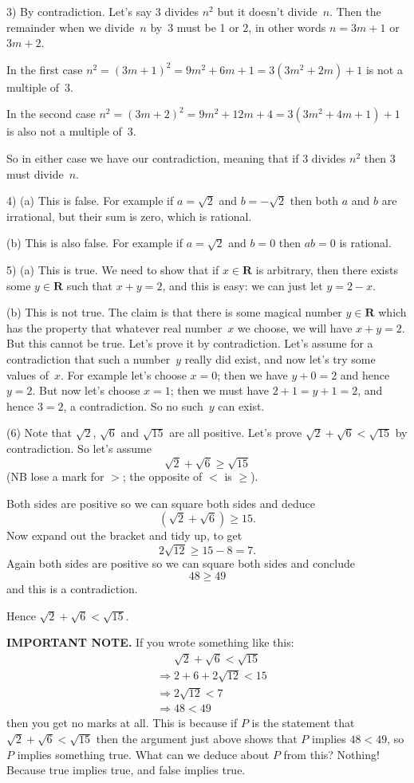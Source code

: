\documentclass[10pt]{article}
\newcommand{\R}{\mathbf{R}}
\begin{document}
\medskip

3) By contradiction. Let's say 3 divides $n^2$ but it doesn't divide~$n$. Then the remainder when we divide~$n$ by~3 must be 1 or 2, in other words $n=3m+1$ or $3m+2$. 

In the first case $n^2=(3m+1)^2=9m^2+6m+1=3(3m^2+2m)+1$ is not a multiple of~3.

In the second case $n^2=(3m+2)^2=9m^2+12m+4=3(3m^2+4m+1)+1$ is also not a multiple of~3. 

So in either case we have our contradiction, meaning that if $3$ divides $n^2$ then $3$ must divide~$n$.

\medskip

4) (a) This is false. For example if $a=\sqrt{2}$ and $b=-\sqrt{2}$ then both $a$ and $b$ are irrational, but their sum is zero, which is rational.

(b) This is also false. For example if $a=\sqrt{2}$ and $b=0$ then $ab=0$ is rational.

\medskip

5) (a) This is true. We need to show that if $x\in\R$ is arbitrary, then there exists some $y\in\R$ such that $x+y=2$, and this is easy: we can just let $y=2-x$.

(b) This is not true. The claim is that there is some magical number $y\in\R$ which has the property that whatever real number~$x$ we choose, we will have $x+y=2$. But this cannot be true. Let's prove it by contradiction. Let's assume for a contradiction that such a number~$y$ really did exist, and now let's try some values of~$x$. For example let's choose $x=0$; then we have $y+0=2$ and hence $y=2$. But now let's choose $x=1$; then we must have $2+1=y+1=2$, and hence $3=2$, a contradiction. So no such~$y$ can exist.

\medskip

(6) Note that $\sqrt{2}$, $\sqrt{6}$ and $\sqrt{15}$ are all positive. Let's prove $\sqrt{2}+\sqrt{6}<\sqrt{15}$ by contradiction. So let's assume
$$\sqrt{2}+\sqrt{6}\geq\sqrt{15}$$
(NB lose a mark for $>$; the opposite of $<$ is $\geq$). 

Both sides are positive so we can square both sides and deduce
$$(\sqrt{2}+\sqrt{6})\geq15.$$
Now expand out the bracket and tidy up, to get
$$2\sqrt{12}\geq15-8=7.$$
Again both sides are positive so we can square both sides and conclude
$$48\geq49$$
and this is a contradiction. 

Hence $\sqrt{2}+\sqrt{6}<\sqrt{15}$.

{\bf IMPORTANT NOTE.} If you wrote something like this:
\begin{align*}
&\phantom{\Rightarrow}\sqrt{2}+\sqrt{6}<\sqrt{15}\\
&\Rightarrow2+6+2\sqrt{12}<15\\
&\Rightarrow2\sqrt{12}<7\\
&\Rightarrow48<49
\end{align*}
then you get no marks at all. This is because if $P$ is the statement that $\sqrt{2}+\sqrt{6}<\sqrt{15}$ then the argument just above shows that $P$ implies $48<49$, so $P$ implies something true. What can we deduce about $P$ from this? Nothing! Because true implies true, and false implies true.
\end{document}
